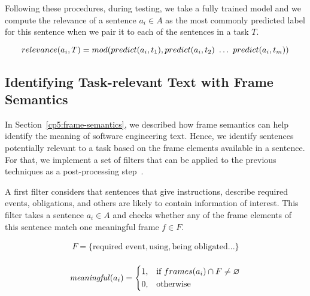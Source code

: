 Following these procedures, during testing, we take a fully trained model and we compute the relevance of a sentence $a_i \in A$ as the most commonly predicted label for this sentence when we pair it to each of the sentences in a task $T$.

\begin{equation}
    relevance(a_i, T) = mod(predict(a_i, t_1), predict(a_i, t_2) ~\dots~ predict(a_i, t_m)) \\
\end{equation}





\subsection{Identifying Task-relevant Text with Frame Semantics}
\label{cp5:approach-filters}





In Section~\ref{cp5:frame-semantics}, we described how frame semantics can help identify the meaning of software engineering text. Hence, we identify sentences potentially relevant to a task based on the frame elements available in a sentence. For that, 
 we implement a set of filters that can be applied to the previous techniques as a post-processing step~\cite{Manning2009IR}.

A first filter considers that sentences that give instructions, describe required events, obligations, and others are likely to contain information of interest. This filter takes a sentence $a_i \in A$ and checks whether any of the frame elements of this sentence match one meaningful frame $f \in F$. 




\begin{equation}
\begin{split}
F = \{ \text{required event}, \text{using}, \text{being obligated} ... \} \\
\end{split}
\end{equation}


\begin{equation}
\text{\textit{meaningful}}(a_i) = \left \{
\begin{aligned}
    &1, && \text{if}\ frames(a_i) \cap F \ne \emptyset \\
    &0, && \text{otherwise}
\end{aligned} \right.
\end{equation} 


